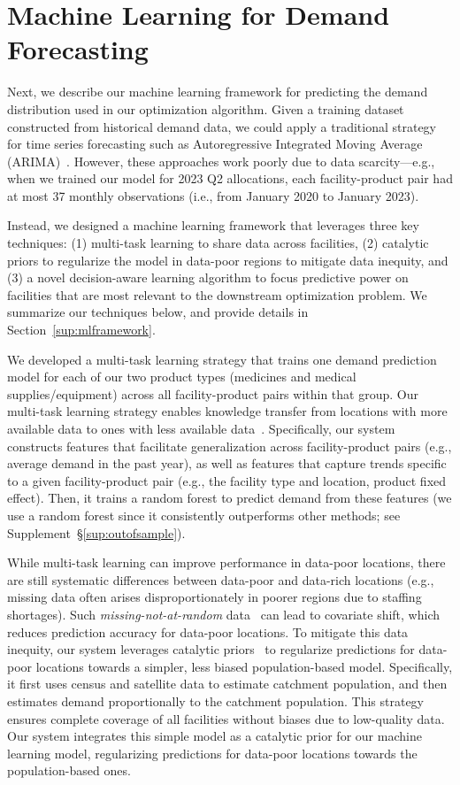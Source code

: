 \documentclass[12pt]{article}
\begin{document}
\section{Machine Learning for Demand Forecasting}

Next, we describe our machine learning framework for predicting the demand distribution used in our optimization algorithm. Given a training dataset constructed from historical demand data, we could apply a traditional strategy for time series forecasting such as Autoregressive Integrated Moving Average (ARIMA)~\cite{gilbert2005arima}. However, these approaches work poorly due to data scarcity---e.g., when we trained our model for 2023 Q2 allocations, each facility-product pair had at most 37 monthly observations (i.e., from January 2020 to January 2023).

Instead, we designed a machine learning framework that leverages three key techniques: (1) multi-task learning to share data across facilities, (2) catalytic priors to regularize the model in data-poor regions to mitigate data inequity, and (3) a novel decision-aware learning algorithm to focus predictive power on facilities that are most relevant to the downstream optimization problem. We summarize our techniques below, and provide details in Section~\ref{sup:mlframework}.

We developed a multi-task learning strategy that trains one demand prediction model for each of our two product types (medicines and medical supplies/equipment) across all facility-product pairs within that group. Our multi-task learning strategy enables knowledge transfer from locations with more available data to ones with less available data~\cite{caruana1997multitask,bastani2021predicting,xu2025multitask}. Specifically, our system constructs features that facilitate generalization across facility-product pairs (e.g., average demand in the past year), as well as features that capture trends specific to a given facility-product pair (e.g., the facility type and location, product fixed effect). Then, it trains a random forest to predict demand from these features (we use a random forest since it consistently outperforms other methods; see Supplement~\S\ref{sup:outofsample}).

While multi-task learning can improve performance in data-poor locations, there are still systematic differences between data-poor and data-rich locations (e.g., missing data often arises disproportionately in poorer regions due to staffing shortages). Such \emph{missing-not-at-random} data~\cite{rubin1976inference} can lead to covariate shift, which reduces prediction accuracy for data-poor locations. To mitigate this data inequity, our system leverages catalytic priors~\cite{huang2020catalytic} to regularize predictions for data-poor locations towards a simpler, less biased population-based model. Specifically, it first uses census and satellite data to estimate catchment population, and then estimates demand proportionally to the catchment population. This strategy ensures complete coverage of all facilities without biases due to low-quality data. Our system integrates this simple model as a catalytic prior for our machine learning model, regularizing predictions for data-poor locations towards the population-based ones.
\end{document}

